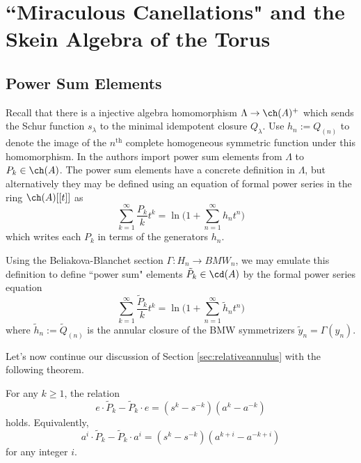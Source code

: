 \chapter{``Miraculous Canellations" and the Skein Algebra of the Torus}



\section{Power Sum Elements}

Recall that there is a injective algebra homomorphism $\Lambda \to \ch(A)^+$ which sends the Schur function $s_\lambda$ to the minimal idempotent closure $Q_\lambda$. Use $h_n := Q_{(n)}$ to denote the image of the $n^\textrm{th}$ complete homogeneous symmetric function under this homomorphism. In  the authors import power sum elements from $\Lambda$ to $P_k \in \ch(A)$. The power sum elements have a concrete definition in $\Lambda$, but alternatively they may be defined using an equation of formal power series in the ring $\ch(A)[[t]]$ as
\begin{equation}
\sum_{k=1}^\infty \frac{P_k}{k} t^k = \ln \Bigg( 1 + \sum_{n=1}^\infty h_n t^n \Bigg)
\end{equation}
which writes each $P_k$ in terms of the generators $h_n$. 

Using the Beliakova-Blanchet section $\Gamma: H_n \to BMW_n$, we may emulate this definition to define ``power sum" elements $\tilde{P}_k \in \cd(A)$ by the formal power series equation
\begin{equation}
\sum_{k=1}^\infty \frac{\tilde{P}_k}{k} t^k = \ln \Bigg( 1 + \sum_{n=1}^\infty \tilde{h}_n t^n \Bigg)
\end{equation}
where $\tilde{h}_n := \tilde{Q}_{(n)}$ is the annular closure of the BMW symmetrizers $\tilde{y}_n = \Gamma(y_n)$.

Let's now continue our discussion of Section \ref{sec:relativeannulus} with the following theorem.

\begin{theorem} \label{thm:powersumcommutator}
For any $k \geq 1$, the relation
\begin{equation}
e \cdot \tilde{P}_k - \tilde{P}_k \cdot e = (s^k - s^{-k}) (a^k - a^{-k})
\end{equation}
holds. Equivalently,
\begin{equation}
a^i \cdot \tilde{P}_k - \tilde{P}_k \cdot a^i = (s^k - s^{-k}) (a^{k+i} - a^{-k+i})
\end{equation}
for any integer $i$.
\end{theorem}

